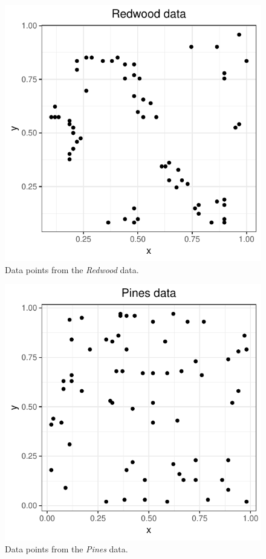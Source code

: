\begin{figure}
    \centering
    \includegraphics[scale=0.95]{figures/prob1_redwood_points.pdf}
    \caption{Data points from the \textit{Redwood} data.}
    \label{fig:redwood_points}
\end{figure}

\begin{figure}
    \centering
    \includegraphics[scale=0.95]{figures/prob1_pines_points.pdf}
    \caption{Data points from the \textit{Pines} data.}
    \label{fig:pines_points}
\end{figure}

